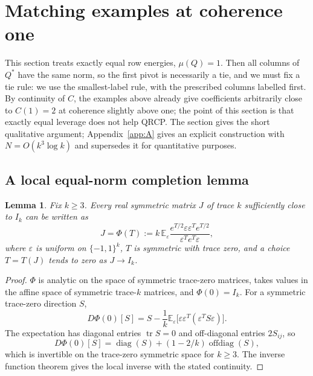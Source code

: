 \documentclass[11pt,a4paper]{article}
\newtheorem{lemma}[theorem]{Lemma}
\theoremstyle{definition}
\numberwithin{equation}{section}
\newcommand{\tr}{\operatorname{tr}}
\begin{document}
\section{Matching examples at coherence one}\label{sec:endpoint}

This section treats exactly equal row energies, $\mu(Q)=1$. Then all columns of $Q^*$ have the same norm, so the
first pivot is necessarily a tie, and we must fix a tie rule: we use the smallest-label rule, with the prescribed
columns labelled first. By continuity of $C$, the examples above already give coefficients arbitrarily close to
$C(1)=2$ at coherence slightly above one; the point of this section is that exactly equal leverage does not help
QRCP. The section gives the short qualitative argument; Appendix~\ref{app:A} gives an explicit construction with
$N=O(k^3\log k)$ and supersedes it for quantitative purposes.

\subsection{A local equal-norm completion lemma}
\begin{lemma}\label{lem:local}
Fix $k\ge3$. Every real symmetric matrix $J$ of trace $k$ sufficiently close to $I_k$ can be written as
\begin{equation}\label{eq:Phi}
 J=\Phi(T):=k\,\mathbb E_\varepsilon\frac{e^{T/2}\varepsilon\varepsilon^Te^{T/2}}{\varepsilon^Te^T\varepsilon},
\end{equation}
where $\varepsilon$ is uniform on $\{-1,1\}^k$, $T$ is symmetric with trace zero, and a choice $T=T(J)$ tends to zero
as $J\to I_k$.
\end{lemma}

\begin{proof}
$\Phi$ is analytic on the space of symmetric trace-zero matrices, takes values in the affine space of symmetric
trace-$k$ matrices, and $\Phi(0)=I_k$. For a symmetric trace-zero direction $S$,
\[
 D\Phi(0)[S]=S-\frac1k\mathbb E_\varepsilon\bigl[\varepsilon\varepsilon^T(\varepsilon^TS\varepsilon)\bigr].
\]
The expectation has diagonal entries $\tr S=0$ and off-diagonal entries $2S_{ij}$, so
\begin{equation}\label{eq:DPhi}
 D\Phi(0)[S]=\operatorname{diag}(S)+(1-2/k)\operatorname{offdiag}(S),
\end{equation}
which is invertible on the trace-zero symmetric space for $k\ge3$. The inverse function theorem gives the local
inverse with the stated continuity.
\end{proof}
\end{document}

